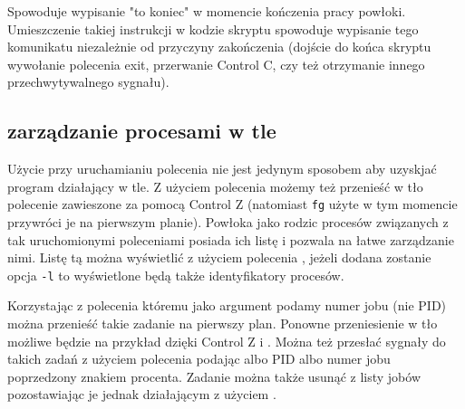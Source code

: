 \noindent
Spowoduje wypisanie "to koniec" w momencie kończenia pracy powłoki.
Umieszczenie takiej instrukcji w kodzie skryptu spowoduje wypisanie tego komunikatu
niezależnie od przyczyny zakończenia (dojście do końca skryptu wywołanie polecenia exit,
przerwanie Control C, czy też otrzymanie innego przechwytywalnego sygnału).

\subsection{zarządzanie procesami w tle}

Użycie \shell{&} przy uruchamianiu polecenia nie jest jedynym sposobem aby uzyskjać program działający w tle.
Z użyciem polecenia  możemy też przenieść w tło polecenie zawieszone za pomocą Control Z (natomiast \texttt{fg} użyte w tym momencie przywróci je na pierwszym planie).
Powłoka jako rodzic procesów związanych z tak uruchomionymi poleceniami posiada ich listę i pozwala na łatwe zarządzanie nimi.
Listę tą można wyświetlić z użyciem polecenia , jeżeli dodana zostanie opcja \texttt{-l} to wyświetlone będą także identyfikatory procesów.

Korzystając z polecenia  któremu jako argument podamy numer jobu (nie PID) można przenieść takie zadanie na pierwszy plan.
Ponowne przeniesienie w tło możliwe będzie na przykład dzięki Control Z i .
Można też przesłać sygnały do takich zadań z użyciem polecenia  podając albo PID albo numer jobu poprzedzony znakiem procenta.
Zadanie można także usunąć z listy jobów pozostawiając je jednak działającym z użyciem .

